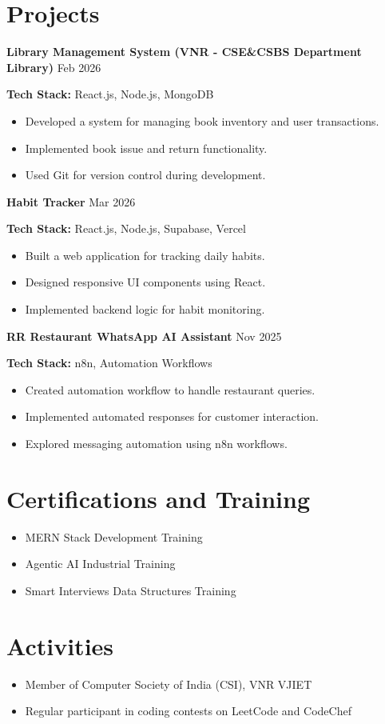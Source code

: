 \documentclass[letterpaper,11pt]{article}
\begin{document}
\section*{Projects}

\noindent\textbf{Library Management System (VNR - CSE\&CSBS Department Library)} \hfill Feb 2026

\textbf{Tech Stack:} React.js, Node.js, MongoDB

\begin{itemize}
\item Developed a system for managing book inventory and user transactions.
\item Implemented book issue and return functionality.
\item Used Git for version control during development.
\end{itemize}

\noindent\textbf{Habit Tracker} \hfill Mar 2026

\textbf{Tech Stack:} React.js, Node.js, Supabase, Vercel

\begin{itemize}
\item Built a web application for tracking daily habits.
\item Designed responsive UI components using React.
\item Implemented backend logic for habit monitoring.
\end{itemize}

\noindent\textbf{RR Restaurant WhatsApp AI Assistant} \hfill Nov 2025

\textbf{Tech Stack:} n8n, Automation Workflows

\begin{itemize}
\item Created automation workflow to handle restaurant queries.
\item Implemented automated responses for customer interaction.
\item Explored messaging automation using n8n workflows.
\end{itemize}

\section*{Certifications and Training}

\begin{itemize}
\item MERN Stack Development Training
\item Agentic AI Industrial Training
\item Smart Interviews Data Structures Training
\end{itemize}

\section*{Activities}

\begin{itemize}
\item Member of Computer Society of India (CSI), VNR VJIET
\item Regular participant in coding contests on LeetCode and CodeChef
\end{itemize}
\end{document}
